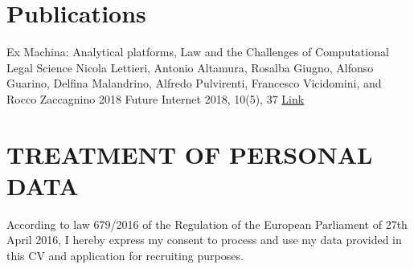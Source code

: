 \documentclass[%
               doublesided,
               paper=a4,
               fontsize=10pt
              ]{my-resume}
\begin{document}
\section{Publications}
\pubforcefullwidth
\begin{comment}


Demonstrate what an \texttt{\textbackslash pagestyle\{empty\}} page looks like.
Also show off the macros for publications that uses small icons for authors, date, journal and links.

Achieving a good looking spacing can be tricky. For empty pagestyles where the full width is available use \texttt{\textbackslash pubforcefullwidth} to force the publoication list to take up all the available space.
The (relative) lengths reserved for date, journal and links can be set with the parameters \texttt{\textbackslash pubdatelength}, \texttt{\textbackslash pubjournallength} and \texttt{\textbackslash publinklength} as in \texttt{\textbackslash setlength\{\textbackslash pubdatelength\}\{0.15 \textbackslash linewidth\}}.
\bigskip
\end{comment}
\publication
	{Ex Machina: Analytical platforms, Law and the Challenges of Computational Legal Science} %
	{Nicola Lettieri, Antonio Altamura, Rosalba Giugno, Alfonso Guarino, Delfina Malandrino, Alfredo Pulvirenti, Francesco Vicidomini, and Rocco Zaccagnino} %
	{2018} %
	{Future Internet 2018, 10(5), 37} %
	{\href{https://www.mdpi.com/1999-5903/10/5/37}{Link}} %
\section{TREATMENT OF PERSONAL DATA}
According to law 679/2016 of the Regulation of the European Parliament of 27th April 2016, I hereby express my consent to process and use my data provided in this CV and application for recruiting purposes.
\end{document}
